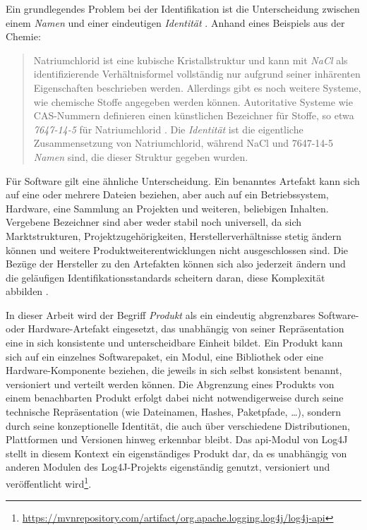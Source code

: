 Ein grundlegendes Problem bei der Identifikation ist die Unterscheidung zwischen einem \textit{Namen} und einer eindeutigen \textit{Identität} \autocite{Manion_Proell_Schmidt2023}.
Anhand eines Beispiels aus der Chemie:

\begin{quote}
    Natriumchlorid ist eine kubische Kristallstruktur und kann mit \textit{NaCl} als identifizierende Verhältnisformel vollständig nur aufgrund seiner inhärenten Eigenschaften beschrieben werden.
    Allerdings gibt es noch weitere Systeme, wie chemische Stoffe angegeben werden können.
    Autoritative Systeme wie CAS-Nummern definieren einen künstlichen Bezeichner für Stoffe, so etwa \textit{7647-14-5} für Natriumchlorid \autocite{Huebner_2003}.
    Die \textit{Identität} ist die eigentliche Zusammensetzung von Natriumchlorid, während NaCl und 7647-14-5 \textit{Namen} sind, die dieser Struktur gegeben wurden.
\end{quote}

Für Software gilt eine ähnliche Unterscheidung.
Ein benanntes Artefakt kann sich auf eine oder mehrere Dateien beziehen, aber auch auf ein Betriebssystem, Hardware, eine Sammlung an Projekten und weiteren, beliebigen Inhalten.
Vergebene Bezeichner sind aber weder stabil noch universell, da sich Marktstrukturen, Projektzugehörigkeiten, Herstellerverhältnisse stetig ändern können und weitere Produktweiterentwicklungen nicht ausgeschlossen sind.
Die Bezüge der Hersteller zu den Artefakten können sich also jederzeit ändern und die geläufigen Identifikationsstandards scheitern daran, diese Komplexität abbilden \autocite{Manion_Proell_Schmidt2023}.

In dieser Arbeit wird der Begriff \textit{Produkt} als ein eindeutig abgrenzbares Software- oder Hardware-Artefakt eingesetzt, das unabhängig von seiner Repräsentation eine in sich konsistente und unterscheidbare Einheit bildet.
Ein Produkt kann sich auf ein einzelnes Softwarepaket, ein Modul, eine Bibliothek oder eine Hardware-Komponente beziehen, die jeweils in sich selbst konsistent benannt, versioniert und verteilt werden können.
Die Abgrenzung eines Produkts von einem benachbarten Produkt erfolgt dabei nicht notwendigerweise durch seine technische Repräsentation (wie Dateinamen, Hashes, Paketpfade, \ldots), sondern durch seine konzeptionelle Identität, die auch über verschiedene Distributionen, Plattformen und Versionen hinweg erkennbar bleibt.
Das \acrshort{api}-Modul von Log4J stellt in diesem Kontext ein eigenständiges Produkt dar, da es unabhängig von anderen Modulen des Log4J-Projekts eigenständig genutzt, versioniert und veröffentlicht wird\footnote{\url{https://mvnrepository.com/artifact/org.apache.logging.log4j/log4j-api}}.

